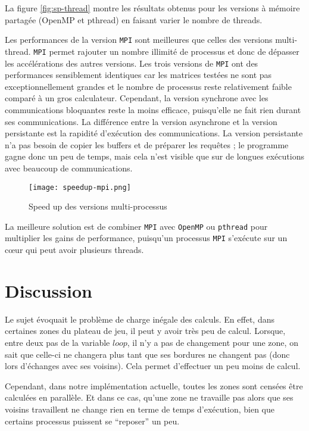 La figure \ref{fig:sp-thread} montre les résultats obtenus pour les versions à mémoire partagée (OpenMP et pthread) en faisant varier le nombre de threads.


Les performances de la version \texttt{MPI} sont meilleures que celles des versions multi-thread. \texttt{MPI} permet rajouter un nombre illimité de processus et donc de dépasser les accélérations des autres versions. Les trois versions de \texttt{MPI} ont des performances sensiblement identiques car les matrices testées ne sont pas exceptionnellement grandes et le nombre de processus reste relativement faible comparé à un gros calculateur. Cependant, la version synchrone avec les communications bloquantes reste la moins efficace, puisqu'elle ne fait rien durant ses communications. La différence entre la version asynchrone et la version persistante est la rapidité d'exécution des communications. La version persistante n'a pas besoin de copier les buffers et de préparer les requêtes ; le programme gagne donc un peu de temps, mais cela n'est visible que sur de longues exécutions avec beaucoup de communications.

\begin{figure}[h!]
\centering
\texttt{[image: speedup-mpi.png]}
\caption{Speed up des versions multi-processus}
\label{fig:sp-proc}
\end{figure}

La meilleure solution est de combiner \texttt{MPI} avec \texttt{OpenMP} ou \texttt{pthread} pour multiplier les gains de performance, puisqu'un processus \texttt{MPI} s'exécute sur un c\oe ur qui peut avoir plusieurs threads.


\section{Discussion} %
\label{sec:discussion}

Le sujet évoquait le problème de charge inégale des calculs. En effet, dans certaines zones du plateau de jeu, il peut y avoir très peu de calcul. Lorsque, entre deux pas de la variable $loop$, il n'y a pas de changement pour une zone, on sait que celle-ci ne changera plus tant que ses bordures ne changent pas (donc lors d'échanges avec ses voisins). Cela permet d'effectuer un peu moins de calcul.

Cependant, dans notre implémentation actuelle, toutes les zones sont censées être calculées en parallèle. Et dans ce cas, qu'une zone ne travaille pas alors que ses voisins travaillent ne change rien en terme de temps d'exécution, bien que certains processus puissent se ``reposer'' un peu. 

